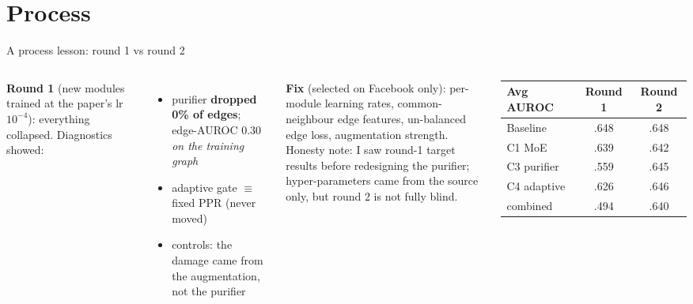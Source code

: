 \documentclass[aspectratio=169,11pt]{beamer}
\begin{document}
\section{Process}
\begin{frame}{A process lesson: round 1 vs round 2}
\begin{columns}[T]
\textbf{Round 1} (new modules trained at the paper's lr $10^{-4}$): everything collapsed. Diagnostics showed:
\begin{itemize}\footnotesize
\item purifier \textbf{dropped 0\% of edges}; edge-AUROC 0.30 \emph{on the training graph}
\item adaptive gate $\equiv$ fixed PPR (never moved)
\item controls: the damage came from the augmentation, not the purifier
\end{itemize}
\textbf{Fix} (selected on Facebook only): per-module learning rates, common-neighbour edge features, un-balanced edge loss, augmentation strength.\\[3pt]
\scriptsize\alert{Honesty note:} I saw round-1 target results before redesigning the purifier; hyper-parameters came from the source only, but round 2 is not fully blind.
\centering\small
\begin{tabular}{lcc}
\toprule
Avg AUROC & Round 1 & Round 2\\ \midrule
Baseline & .648 & .648\\
C1 MoE & .639 & .642\\
C3 purifier & \textcolor{bad}{.559} & \textcolor{good}{.645}\\
C4 adaptive & .626 & .646\\
combined & \textcolor{bad}{.494} & .640\\ \bottomrule
\end{tabular}
\end{columns}
\end{frame}
\end{document}
